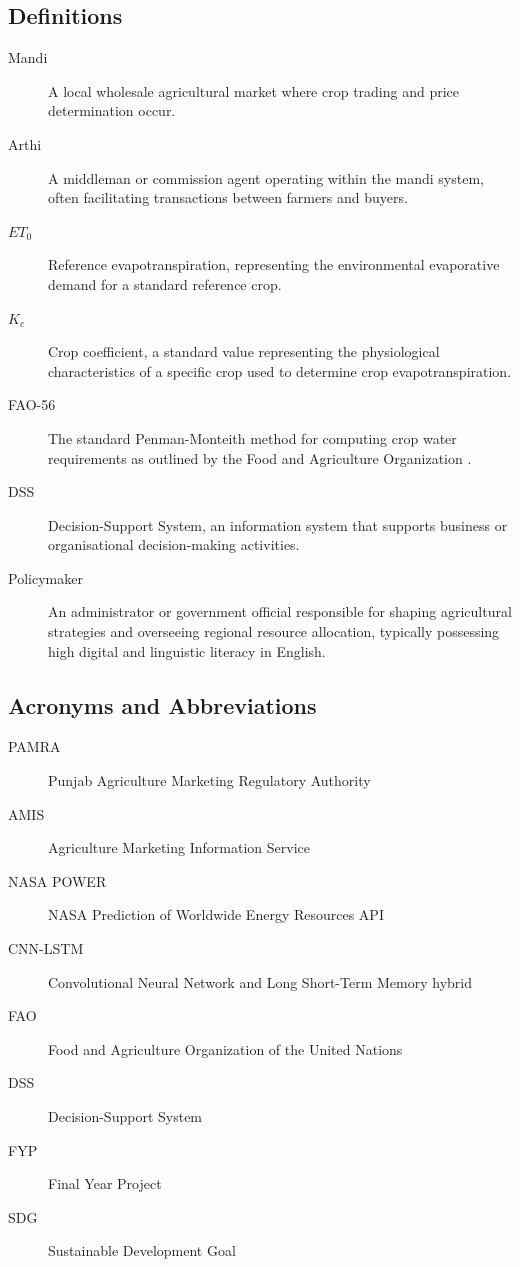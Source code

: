 \documentclass{FastFyp}
\begin{document}
\subsection{Definitions}
\begin{description}
    \item[Mandi] A local wholesale agricultural market where crop trading and price determination occur.
    \item[Arthi] A middleman or commission agent operating within the mandi system, often facilitating transactions between farmers and buyers.
    \item[$ET_0$] Reference evapotranspiration, representing the environmental evaporative demand for a standard reference crop.
    \item[$K_c$] Crop coefficient, a standard value representing the physiological characteristics of a specific crop used to determine crop evapotranspiration.
    \item[FAO-56] The standard Penman-Monteith method for computing crop water requirements as outlined by the Food and Agriculture Organization \cite{allen1998crop}.
    \item[DSS] Decision-Support System, an information system that supports business or organisational decision-making activities.
    \item[Policymaker] An administrator or government official responsible for shaping agricultural strategies and overseeing regional resource allocation, typically possessing high digital and linguistic literacy in English.
\end{description}

\subsection{Acronyms and Abbreviations}
\begin{description}
    \item[PAMRA] Punjab Agriculture Marketing Regulatory Authority
    \item[AMIS] Agriculture Marketing Information Service
    \item[NASA POWER] NASA Prediction of Worldwide Energy Resources API
    \item[CNN-LSTM] Convolutional Neural Network and Long Short-Term Memory hybrid
    \item[FAO] Food and Agriculture Organization of the United Nations
    \item[DSS] Decision-Support System
    \item[FYP] Final Year Project
    \item[SDG] Sustainable Development Goal
\end{description}
\end{document}
